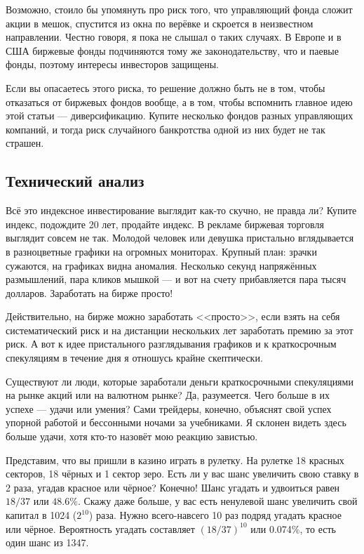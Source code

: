 Возможно, стоило бы упомянуть про риск того, что управляющий фонда сложит акции 
в мешок, спустится из окна по верёвке и скроется в неизвестном направлении. 
Честно говоря, я пока не слышал о таких случаях. В Европе и в США биржевые фонды 
подчиняются тому же законодательству, что и паевые фонды, поэтому интересы 
инвесторов защищены. 

Если вы опасаетесь этого риска, то решение должно быть не в том, чтобы  
отказаться от биржевых фондов вообще, а в том, чтобы вспомнить главное идею этой 
статьи --- диверсификацию. Купите несколько фондов разных управляющих компаний, 
и тогда риск случайного банкротства одной из них будет не так страшен.

\subsection{Технический анализ}

Всё это индексное инвестирование выглядит как-то скучно, не правда ли? Купите
индекс, подождите 20 лет, продайте индекс. В рекламе биржевая торговля выглядит
совсем не так. Молодой человек или девушка пристально вглядывается в 
разноцветные графики на огромных мониторах. Крупный план: зрачки сужаются, на 
графиках видна аномалия. Несколько секунд напряжённых размышлений, пара кликов 
мышкой --- и вот на счету прибавляется пара тысяч долларов. Заработать на 
бирже просто!

Действительно, на бирже можно заработать <<просто>>, если взять на себя 
систематический риск и на дистанции нескольких лет заработать премию за этот 
риск. А вот к идее пристального разглядывания графиков и к краткосрочным 
спекуляциям в течение дня я отношусь крайне скептически.

Существуют ли люди, которые заработали деньги краткосрочными спекуляциями на 
рынке акций или на валютном рынке? Да, разумеется. Чего больше в их успехе --- 
удачи или умения? Сами трейдеры, конечно, объяснят свой успех упорной работой и 
бессонными ночами за учебниками. Я склонен видеть здесь больше удачи, хотя 
кто-то назовёт мою реакцию завистью.

Представим, что вы пришли в казино играть в рулетку. На рулетке 18 красных 
секторов, 18 чёрных и 1 сектор зеро. Есть ли у вас шанс увеличить свою ставку в
2 раза, угадав красное или чёрное? Конечно! Шанс угадать и удвоиться равен 
$18/37$ или $48.6\%$. Скажу даже больше, у вас есть ненулевой шанс увеличить 
свой капитал в 1024 ($2^{10}$) раза. Нужно всего-навсего 10 раз подряд угадать 
красное или чёрное. Вероятность угадать составляет $(18/37)^{10}$ или 0.074\%, 
то есть один шанс из 1347.

